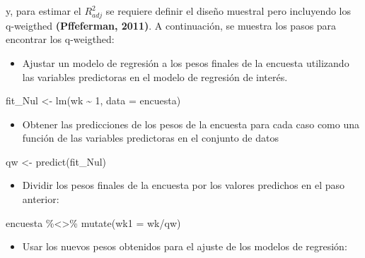 \documentclass[
  12pt,
]{book}
\newenvironment{Shaded}{\begin{snugshade}}{\end{snugshade}}
\newcommand{\AttributeTok}[1]{\textcolor[rgb]{0.77,0.63,0.00}{#1}}
\newcommand{\DecValTok}[1]{\textcolor[rgb]{0.00,0.00,0.81}{#1}}
\newcommand{\FunctionTok}[1]{\textcolor[rgb]{0.00,0.00,0.00}{#1}}
\newcommand{\NormalTok}[1]{#1}
\newcommand{\OtherTok}[1]{\textcolor[rgb]{0.56,0.35,0.01}{#1}}
\newcommand{\SpecialCharTok}[1]{\textcolor[rgb]{0.00,0.00,0.00}{#1}}
\providecommand{\tightlist}{%
  \setlength{\itemsep}{0pt}\setlength{\parskip}{0pt}}
\begin{document}
y, para estimar el \(R_{adj}^{2}\) se requiere definir el diseño muestral pero incluyendo los q-weigthed \textbf{(Pffeferman, 2011)}. A continuación, se muestra los pasos para encontrar los q-weigthed:

\begin{itemize}
\tightlist
\item
  Ajustar un modelo de regresión a los pesos finales de la encuesta utilizando las variables predictoras en el modelo de regresión de interés.
\end{itemize}

\begin{Shaded}
\begin{Highlighting}[]
\NormalTok{fit\_Nul }\OtherTok{\textless{}{-}} \FunctionTok{lm}\NormalTok{(wk }\SpecialCharTok{\textasciitilde{}} \DecValTok{1}\NormalTok{, }\AttributeTok{data =}\NormalTok{ encuesta)}
\end{Highlighting}
\end{Shaded}

\begin{itemize}
\tightlist
\item
  Obtener las predicciones de los pesos de la encuesta para cada caso como una función de las variables predictoras en el conjunto de datos
\end{itemize}

\begin{Shaded}
\begin{Highlighting}[]
\NormalTok{qw }\OtherTok{\textless{}{-}} \FunctionTok{predict}\NormalTok{(fit\_Nul)}
\end{Highlighting}
\end{Shaded}

\begin{itemize}
\tightlist
\item
  Dividir los pesos finales de la encuesta por los valores predichos en el paso anterior:
\end{itemize}

\begin{Shaded}
\begin{Highlighting}[]
\NormalTok{encuesta }\SpecialCharTok{\%\textless{}\textgreater{}\%} \FunctionTok{mutate}\NormalTok{(}\AttributeTok{wk1 =}\NormalTok{ wk}\SpecialCharTok{/}\NormalTok{qw)}
\end{Highlighting}
\end{Shaded}

\begin{itemize}
\tightlist
\item
  Usar los nuevos pesos obtenidos para el ajuste de los modelos de regresión:
\end{itemize}
\end{document}
